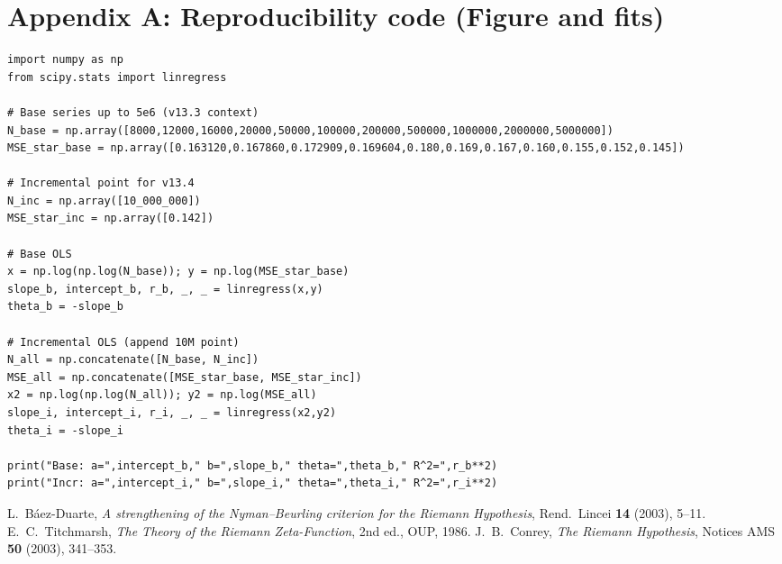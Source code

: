 \documentclass[11pt]{article}
\theoremstyle{remark}
\begin{document}
\section*{Appendix A: Reproducibility code (Figure and fits)}
\begin{verbatim}
import numpy as np
from scipy.stats import linregress

# Base series up to 5e6 (v13.3 context)
N_base = np.array([8000,12000,16000,20000,50000,100000,200000,500000,1000000,2000000,5000000])
MSE_star_base = np.array([0.163120,0.167860,0.172909,0.169604,0.180,0.169,0.167,0.160,0.155,0.152,0.145])

# Incremental point for v13.4
N_inc = np.array([10_000_000])
MSE_star_inc = np.array([0.142])

# Base OLS
x = np.log(np.log(N_base)); y = np.log(MSE_star_base)
slope_b, intercept_b, r_b, _, _ = linregress(x,y)
theta_b = -slope_b

# Incremental OLS (append 10M point)
N_all = np.concatenate([N_base, N_inc])
MSE_all = np.concatenate([MSE_star_base, MSE_star_inc])
x2 = np.log(np.log(N_all)); y2 = np.log(MSE_all)
slope_i, intercept_i, r_i, _, _ = linregress(x2,y2)
theta_i = -slope_i

print("Base: a=",intercept_b," b=",slope_b," theta=",theta_b," R^2=",r_b**2)
print("Incr: a=",intercept_i," b=",slope_i," theta=",theta_i," R^2=",r_i**2)
\end{verbatim}

\begin{thebibliography}{9}
 L.~Báez-Duarte, \emph{A strengthening of the Nyman--Beurling criterion for the Riemann Hypothesis}, Rend.~Lincei \textbf{14} (2003), 5--11.
 E.~C.~Titchmarsh, \emph{The Theory of the Riemann Zeta-Function}, 2nd ed., OUP, 1986.
 J.~B.~Conrey, \emph{The Riemann Hypothesis}, Notices AMS \textbf{50} (2003), 341--353.
\end{thebibliography}
\end{document}
